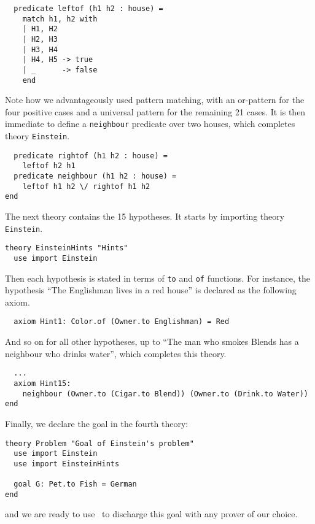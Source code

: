 \begin{verbatim}
  predicate leftof (h1 h2 : house) =
    match h1, h2 with
    | H1, H2
    | H2, H3
    | H3, H4
    | H4, H5 -> true
    | _      -> false
    end
\end{verbatim}
Note how we advantageously used pattern matching, with an or-pattern
for the four positive cases and a universal pattern for the remaining
21 cases. It is then immediate to define a \texttt{neighbour}
predicate over two houses, which completes theory \texttt{Einstein}.
\begin{verbatim}
  predicate rightof (h1 h2 : house) =
    leftof h2 h1
  predicate neighbour (h1 h2 : house) =
    leftof h1 h2 \/ rightof h1 h2
end
\end{verbatim}

The next theory contains the 15 hypotheses. It starts by importing
theory \texttt{Einstein}.
\begin{verbatim}
theory EinsteinHints "Hints"
  use import Einstein
\end{verbatim}
Then each hypothesis is stated in terms of \texttt{to} and \texttt{of}
functions. For instance, the hypothesis ``The Englishman lives in a
red house'' is declared as the following axiom.
\begin{verbatim}
  axiom Hint1: Color.of (Owner.to Englishman) = Red
\end{verbatim}
And so on for all other hypotheses, up to
``The man who smokes Blends has a neighbour who drinks water'', which completes
this theory.
\begin{verbatim}
  ...
  axiom Hint15:
    neighbour (Owner.to (Cigar.to Blend)) (Owner.to (Drink.to Water))
end
\end{verbatim}
Finally, we declare the goal in the fourth theory:
\begin{verbatim}
theory Problem "Goal of Einstein's problem"
  use import Einstein
  use import EinsteinHints

  goal G: Pet.to Fish = German
end
\end{verbatim}
and we are ready to use \why\ to discharge this goal with any prover
of our choice.

